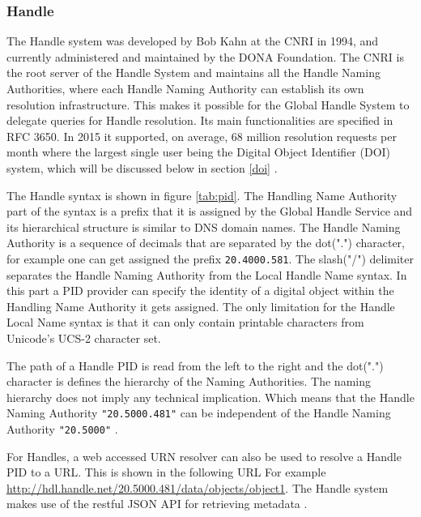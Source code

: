 \subsubsection{Handle}
The Handle system was developed by Bob Kahn at the CNRI in 1994, and currently administered and maintained by the DONA Foundation. The CNRI is the root server of the Handle System and maintains all the Handle Naming Authorities, where each Handle Naming Authority can establish its own resolution infrastructure. This makes it possible for the Global Handle System to delegate queries for Handle resolution. 
Its main functionalities are specified in RFC 3650. In 2015 it supported, on average, 68 million resolution requests per month where the largest single user being the Digital Object Identifier (DOI) system, which will be discussed below in section \ref{doi} \cite{hdl-us}. 

The Handle syntax is shown in figure \ref{tab:pid}. The Handling Name Authority part of the syntax is a prefix that it is assigned by the Global Handle
Service and its hierarchical structure is similar to DNS domain names. The Handle Naming Authority is a sequence of decimals that are separated by the
dot(".") character, for example one can get assigned the prefix \texttt{20.4000.581}. 
The slash("/") delimiter separates the Handle Naming Authority from the Local Handle Name syntax. In this part a PID provider can specify the identity of a digital object within the Handling Name Authority it gets assigned. 
The only limitation for the Handle Local Name syntax is that it can only contain printable characters from Unicode's
UCS-2 character set.

The path of a Handle PID is read from the left to the right and the dot(".") character is defines the hierarchy of the Naming Authorities. The naming hierarchy
does not imply any technical implication. Which means that the Handle Naming Authority \texttt{"20.5000.481"} can be independent of the Handle Naming Authority \texttt{"20.5000"} \cite{icn-bd}.

For Handles, a web accessed URN resolver can also be used to resolve a Handle PID to a URL. This is shown in the following URL For example \url{http://hdl.handle.net/20.5000.481/data/objects/object1}. The Handle system makes use of the restful JSON API for retrieving metadata \cite{hdl-api}.


